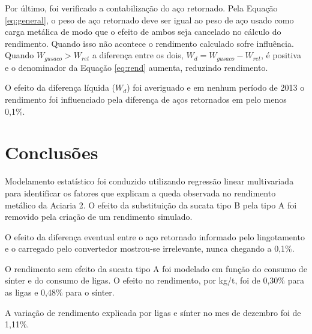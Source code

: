 \begin{multicols}{2}
	Por último, foi verificado a contabilização do aço retornado. Pela Equação \ref{eq:general}, o peso de aço retornado deve ser igual ao peso de aço usado como carga metálica de modo que o efeito de ambos seja cancelado no cálculo do rendimento. Quando isso não acontece o rendimento calculado sofre influência. Quando $W_{gusaco} > W_{ret}$ a diferença entre os dois, $W_{d} = W_{gusaco}-W_{ret}$, é positiva e o denominador da Equação \ref{eq:rend} aumenta, reduzindo rendimento. 
	
	O efeito da diferença líquida ($W_{d}$) foi averiguado e em nenhum período de 2013 o rendimento foi influenciado pela diferença de aços retornados em pelo menos 0,1\%.
\section{Conclusões}
	Modelamento estatístico foi conduzido utilizando regressão linear multivariada para identificar os fatores que explicam a queda observada no rendimento metálico da Aciaria 2. O efeito da substituição da sucata tipo B pela tipo A foi removido pela criação de um rendimento simulado. 
	
	O efeito da diferença eventual entre o aço retornado informado pelo lingotamento e o carregado pelo convertedor mostrou-se irrelevante, nunca chegando a 0,1\%.
	
	O rendimento sem efeito da sucata tipo A foi modelado em função do consumo de sínter e do consumo de ligas. O efeito no rendimento, por kg/t, foi de 0,30\% para as ligas e 0,48\% para o sínter.
	
	A variação de rendimento explicada por ligas e sínter no mes de dezembro foi de 1,11\%.

% 
% 
\renewcommand{\bibname}{Referências}


\end{multicols}	